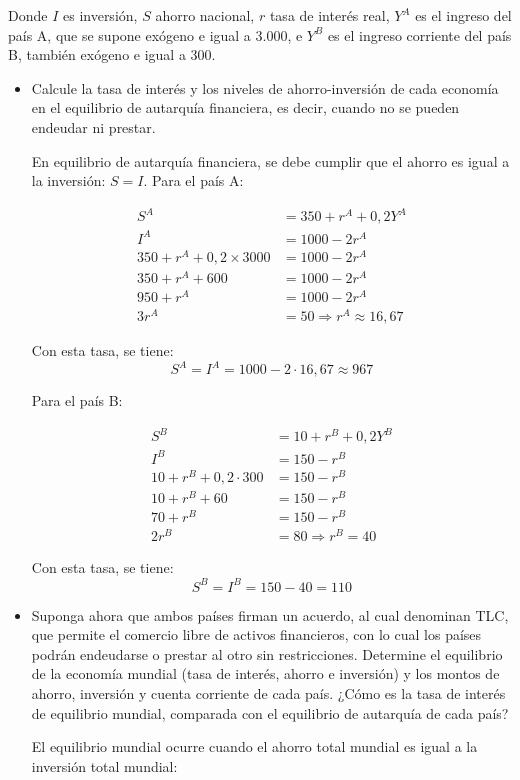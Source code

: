 \documentclass[a4paper]{article}
\begin{document}
Donde $I$ es inversión, $S$ ahorro nacional, $r$ tasa de interés real, $Y^A$ es el ingreso del país A, que se supone exógeno e igual a 3.000, e $Y^B$ es el ingreso corriente del país B, también exógeno e igual a 300.
\begin{itemize}
    \item[a)] Calcule la tasa de interés y los niveles de ahorro-inversión de cada economía en el equilibrio de autarquía financiera, es decir, cuando no se pueden endeudar ni prestar.
    
\begin{solution}
        En equilibrio de autarquía financiera, se debe cumplir que el ahorro es igual a la inversión: \( S = I \). Para el país A:

        \begin{align*}
        S^A &= 350 + r^A + 0{,}2Y^A \\
        I^A &= 1000 - 2r^A \\
        350 + r^A + 0{,}2 \times 3000 &= 1000 - 2r^A \\
        350 + r^A + 600 &= 1000 - 2r^A \\
        950 + r^A &= 1000 - 2r^A \\
        3r^A &= 50 \Rightarrow r^A \approx 16{,}67
        \end{align*}

        Con esta tasa, se tiene:
        \[
        S^A = I^A = 1000 - 2 \cdot 16{,}67 \approx 967
        \]

        Para el país B:

        \begin{align*}
        S^B &= 10 + r^B + 0{,}2Y^B \\
        I^B &= 150 - r^B \\
        10 + r^B + 0{,}2 \cdot 300 &= 150 - r^B \\
        10 + r^B + 60 &= 150 - r^B \\
        70 + r^B &= 150 - r^B \\
        2r^B &= 80 \Rightarrow r^B = 40
        \end{align*}

        Con esta tasa, se tiene:
        \[
        S^B = I^B = 150 - 40 = 110
        \]
    \end{solution}
    
    \item[b)] Suponga ahora que ambos países firman un acuerdo, al cual denominan TLC, que permite el comercio libre de activos financieros, con lo cual los países podrán endeudarse o prestar al otro sin restricciones. Determine el equilibrio de la economía mundial (tasa de interés, ahorro e inversión) y los montos de ahorro, inversión y cuenta corriente de cada país. ¿Cómo es la tasa de interés de equilibrio mundial, comparada con el equilibrio de autarquía de cada país?
    \begin{solution}
El equilibrio mundial ocurre cuando el ahorro total mundial es igual a la inversión total mundial:


\end{solution}
\end{itemize}
\end{document}
